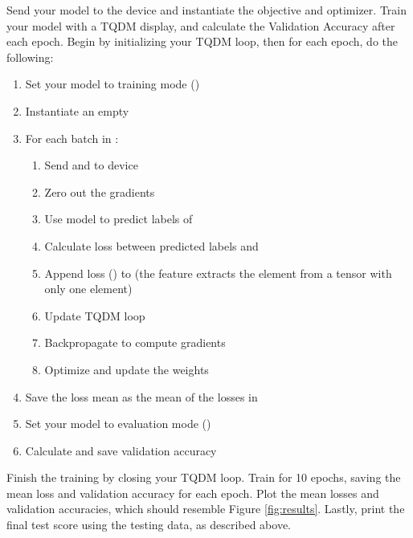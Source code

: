 \begin{problem}
Send your model to the device and instantiate the objective and optimizer.
Train your model with a TQDM display, and calculate the Validation Accuracy after each epoch. 
Begin by initializing your TQDM loop, then for each epoch, do the following:

\begin{enumerate}
\item Set your model to training mode ()
\item Instantiate an empty 
\item For each batch in :
\begin{enumerate}
    \item Send  and  to device
    \item Zero out the gradients 
    \item Use model to predict labels of 
    \item Calculate loss between predicted labels and 
    \item Append loss () to  (the  feature extracts the element from a tensor with only one element)
    \item Update TQDM loop 
    \item Backpropagate to compute gradients 
    \item Optimize and update the weights
\end{enumerate}
\item Save the loss mean as the mean of the losses in 
\item Set your model to evaluation mode ()
\item Calculate and save validation accuracy
\end{enumerate}
Finish the training by closing your TQDM loop.
Train for 10 epochs, saving the mean loss and validation accuracy for each epoch.
Plot the mean losses and validation accuracies, which should resemble Figure \ref{fig:results}.
Lastly, print the final test score using the testing data, as described above.

\label{prob:train}
\end{problem}

